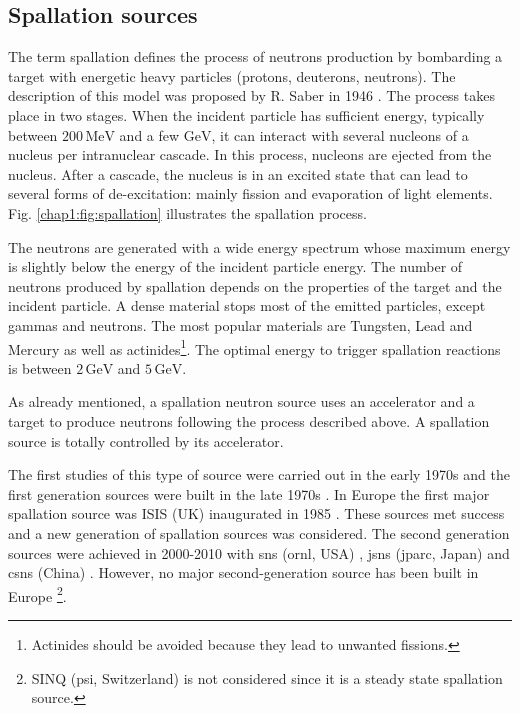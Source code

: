 \begin{refsection}
  \subsection{Spallation sources}
  The term spallation defines the process of neutrons production by bombarding a target with energetic heavy particles (protons, deuterons, neutrons). The description of this model was proposed by R. Saber in 1946 \cite{PhysRev.72.1114}. The process takes place in two stages. When the incident particle has sufficient energy, typically between $200\,\mathrm{MeV}$ and a few $\mathrm{GeV}$, it can interact with several nucleons of a nucleus per intranuclear cascade. In this process, nucleons are ejected from the nucleus. After a cascade, the nucleus is in an excited state that can lead to several forms of de-excitation: mainly fission and evaporation of light elements. Fig. \ref{chap1:fig:spallation} illustrates the spallation process.

  The neutrons are generated with a wide energy spectrum whose maximum energy is slightly below the energy of the incident particle energy. The number of neutrons produced by spallation depends on the properties of the target and the incident particle. %
  A dense material stops most of the emitted particles, except gammas and neutrons. The most popular materials are Tungsten, Lead and Mercury as well as actinides\footnote{Actinides should be avoided because they lead to unwanted fissions.}. The optimal energy to trigger spallation reactions is between $2\,\mathrm{GeV}$ and $5\,\mathrm{GeV}$.

  As already mentioned, a spallation neutron source uses an accelerator and a target to produce neutrons following the process described above. A spallation source is totally controlled by its accelerator.%

  The first studies of this type of source were carried out in the early 1970s and the first generation sources were built in the late 1970s \cite{klein1994}. In Europe the first major spallation source was ISIS (UK) inaugurated in 1985 \cite{THOMASON201961}. These sources met success and a new generation of spallation sources was considered. The second generation sources were achieved in 2000-2010 with \acrshort{sns} (\acrshort{ornl}, USA) \cite{Mason2005}, \acrshort{jsns} (\acrshort{jparc}, Japan) \cite{Ikeda2002} and \acrshort{csns} (China) \cite{Chen2016}. However, no major second-generation source has been built in Europe \footnote{SINQ \cite{WAGNER2006541} (\acrshort{psi}, Switzerland) is not considered since it is a steady state spallation source.}.


\end{refsection}
